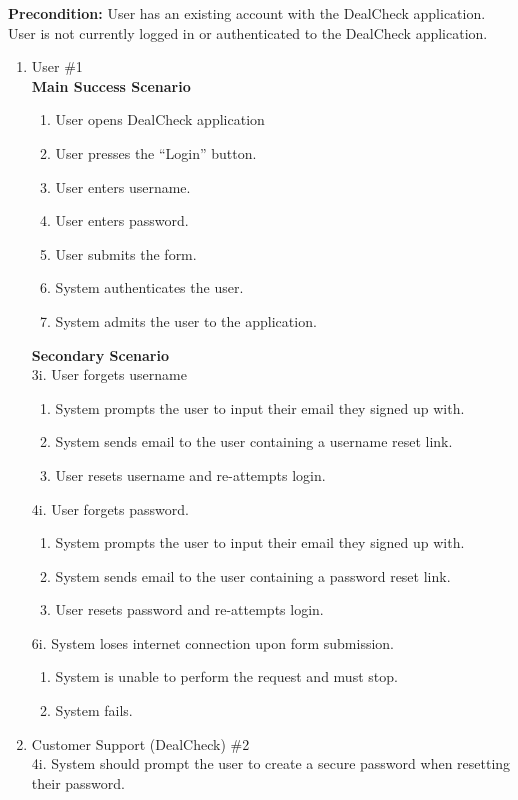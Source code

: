 \documentclass[]{article}
\begin{document}
\begin{enumerate}
\begin{enumerate}[{\bf {BE}1.}]
	{\bf Precondition:} User has an existing account with the DealCheck application. 
	User is not currently logged in or authenticated to the DealCheck application.
	\begin{enumerate}[{\bf VP1.}]
		\item User \#1 \\
		{\bf Main Success Scenario}
		\begin{enumerate}[1.]
			\item User opens DealCheck application
			\item User presses the “Login” button.
			\item User enters username.
			\item User enters password.
			\item User submits the form.
			\item System authenticates the user.
			\item System admits the user to the application.
		\end{enumerate}
		{\bf Secondary Scenario} \\
		3i. User forgets username
		\begin{enumerate}[{3i}.1]
			\item System prompts the user to input their email they signed up with.
			\item System sends email to the user containing a username reset link.
			\item User resets username and re-attempts login.
		\end{enumerate}
		4i. User forgets password.
		\begin{enumerate}[{4i}.1]
			\item System prompts the user to input their email they signed up with.
			\item System sends email to the user containing a password reset link.
			\item User resets password and re-attempts login.
		\end{enumerate}
		6i. System loses internet connection upon form submission.
		\begin{enumerate}[{6i}.1]
			\item System is unable to perform the request and must stop.
			\item System fails.
		\end{enumerate}
		\item Customer Support (DealCheck) \#2 \\
			4i. System should prompt the user to create a secure password when resetting their password.

\end{enumerate}
\end{enumerate}
\end{enumerate}
\end{document}
